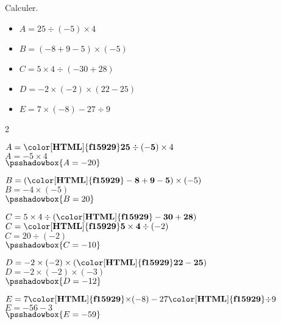 \begin{exercice*}
    Calculer.
    \begin{itemize}
        \item[] $ A = 25\div(-5)\times4$
        \item[] $ B = (-8+9-5)\times(-5)$
        \item[] $ C = 5\times4\div(-30+28)$
        \item[] $ D = -2\times(-2)\times(22-25)$
        \item[] $ E = 7\times(-8)-27\div9$
    \end{itemize}

\end{exercice*}
\begin{corrige}
    \phantom{rrr}
    \begin{multicols}2
    \begin{list}{}{}
        \item 
        $ A = \mathbf{{\color[HTML]{f15929}25\div(-5)}}\times4$ \\
        $ A = -5\times4$ \\
        $ \psshadowbox{A = -20} $ 
        \item 
        $ B = (\mathbf{{\color[HTML]{f15929}-8+9-5}})\times(-5)$ \\
        $ B = -4\times(-5)$ \\
        $ \psshadowbox{B = 20} $ 
        \columnbreak
        \item 
        $ C = 5\times4\div(\mathbf{{\color[HTML]{f15929}-30+28}})$ \\
        $ C = \mathbf{{\color[HTML]{f15929}5\times4}}\div(-2)$ \\
        $ C = 20\div(-2)$ \\
        $ \psshadowbox{C = -10} $ 
        \item 
        $ D = -2\times(-2)\times(\mathbf{{\color[HTML]{f15929}22-25}})$ \\
        $ D = -2\times(-2)\times(-3)$ \\
        $ \psshadowbox{D = -12} $ 
        \item
        $ E = 7\mathbf{{\color[HTML]{f15929}\times}}(-8)-27\mathbf{{\color[HTML]{f15929}\div}}9$ \\
        $ E = -56-3$ \\
        $ \psshadowbox{E = -59} $ 
    \end{list}
\end{multicols}
\end{corrige}

